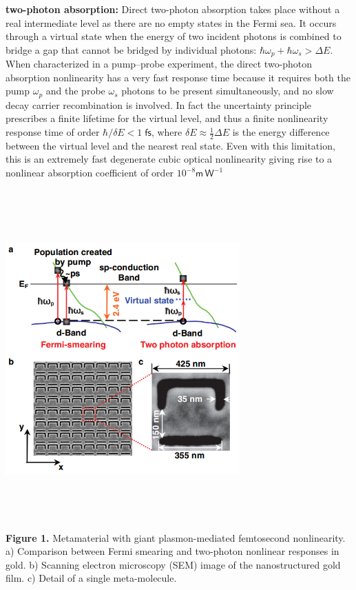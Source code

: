 \documentclass[]{article}
\begin{document}
\textbf{two-photon absorption:} Direct two-photon absorption takes place
without a real intermediate level as there are no empty states in the
Fermi sea. It occurs through a virtual state when the energy of two
incident photons is combined to bridge a gap that cannot be bridged by
individual photons: $ \hbar \omega_p + \hbar \omega_s > \Delta E$. When
characterized in a pump--probe experiment, the direct two-photon
absorption nonlinearity has a very fast response time because it
requires both the pump \(\omega_p\) and the probe \(\omega_s\) photons
to be present simultaneously, and no slow decay carrier recombination is
involved. In fact the uncertainty principle prescribes a finite lifetime
for the virtual level, and thus a finite nonlinearity response time of
order \( \hbar/\delta E < 1\;\mathsf{fs}\), where
\( \delta E \approx \frac{1}{2} \Delta E\) is the energy difference
between the virtual level and the nearest real state. Even with this
limitation, this is an extremely fast degenerate cubic optical
nonlinearity giving rise to a nonlinear absorption coefficient of order
\( 10^{-8} \mathsf m\,\mathsf W^{-1}\)

\includegraphics[width=9cm,height=13cm]{image/001_01.png}\\
\textbf{Figure 1.} Metamaterial with giant plasmon-mediated femtosecond
nonlinearity. a) Comparison between Fermi smearing and two-photon
nonlinear responses in gold. b) Scanning electron microscopy (SEM) image
of the nanostructured gold film. c) Detail of a single meta-molecule.
\end{document}
